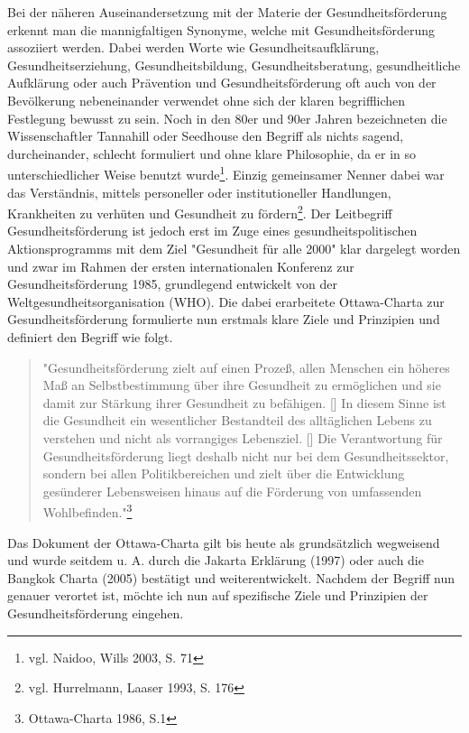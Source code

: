 Bei der näheren Auseinandersetzung mit der Materie der Gesundheitsförderung erkennt man die mannigfaltigen Synonyme, welche mit Gesundheitsförderung assoziiert werden. Dabei werden Worte wie Gesundheitsaufklärung, Gesundheitserziehung, Gesundheitsbildung, Gesundheitsberatung, gesundheitliche Aufklärung oder auch Prävention und Gesundheitsförderung oft auch von der Bevölkerung nebeneinander verwendet ohne sich der klaren begrifflichen Festlegung bewusst zu sein. Noch in den 80er und 90er Jahren bezeichneten die Wissenschaftler Tannahill oder Seedhouse den Begriff als nichts sagend, durcheinander, schlecht formuliert und ohne klare Philosophie, da er in so unterschiedlicher Weise benutzt wurde\footnote{vgl. Naidoo, Wills 2003, S. 71}. Einzig gemeinsamer Nenner dabei war das Verständnis, mittels personeller oder institutioneller Handlungen, Krankheiten zu verhüten und Gesundheit zu fördern\footnote{vgl. Hurrelmann, Laaser 1993, S. 176}. Der Leitbegriff Gesundheitsförderung ist jedoch erst im Zuge eines gesundheitspolitischen Aktionsprogramms mit dem Ziel "Gesundheit für alle 2000" klar dargelegt worden und zwar im Rahmen der ersten internationalen Konferenz zur Gesundheitsförderung 1985, grundlegend entwickelt von der Weltgesundheitsorganisation (WHO). Die dabei erarbeitete Ottawa-Charta zur Gesundheitsförderung formulierte nun erstmals klare Ziele und Prinzipien und definiert den Begriff wie folgt.

\begin{quotation}
"Gesundheitsförderung zielt auf einen Prozeß, allen Menschen ein höheres Maß an Selbstbestimmung über ihre Gesundheit zu ermöglichen und sie damit zur Stärkung ihrer Gesundheit zu befähigen. [\punkte] In diesem Sinne ist die Gesundheit ein wesentlicher Bestandteil des alltäglichen Lebens zu verstehen und nicht als vorrangiges Lebensziel. [\punkte] Die Verantwortung für Gesundheitsförderung liegt deshalb nicht nur bei dem Gesundheitssektor, sondern bei allen Politikbereichen und zielt über die Entwicklung gesünderer Lebensweisen hinaus auf die Förderung von umfassenden Wohlbefinden."\footnote{Ottawa-Charta 1986, S.1}
\end{quotation}

Das Dokument der Ottawa-Charta gilt bis heute als grundsätzlich wegweisend und wurde seitdem u. A. durch die Jakarta Erklärung (1997) oder auch die Bangkok Charta (2005) bestätigt und weiterentwickelt.
Nachdem der Begriff nun genauer verortet ist, möchte ich nun auf spezifische Ziele und Prinzipien der Gesundheitsförderung eingehen.

